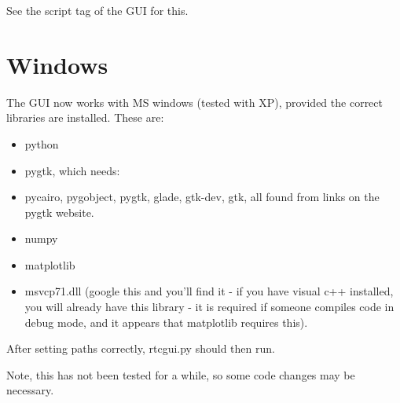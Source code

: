 \documentclass[a4,10pt]{article}
\begin{document}
See the script tag of the GUI for this.





\section{Windows}
The GUI now works with MS windows (tested with XP), provided the
correct libraries are installed.  These are:
\begin{itemize}
\item python
\item pygtk, which needs:
\item pycairo, pygobject, pygtk, glade, gtk-dev, gtk, all found from links
on the pygtk website.
\item numpy
\item matplotlib
\item msvcp71.dll (google this and you'll find it - if you have visual c++
installed, you will already have this library - it is required if
someone compiles code in debug mode, and it appears that matplotlib
requires this).
\end{itemize}
After setting paths correctly, rtcgui.py should then run.

Note, this has not been tested for a while, so some code changes may
be necessary.
\end{document}
